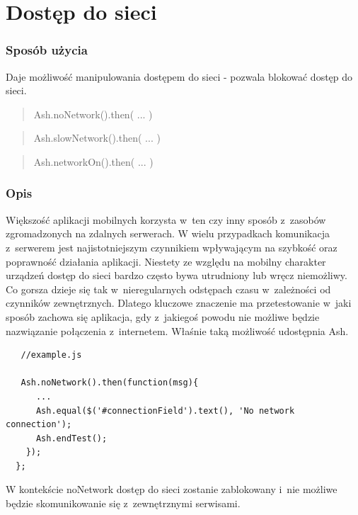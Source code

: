 \documentclass[brudnopis]{xmgr}
\begin{document}
\section{Dostęp do sieci}

\subsubsection{Sposób użycia}

Daje możliwość manipulowania dostępem do sieci - pozwala blokować dostęp do sieci.

\begin{quote}
Ash.noNetwork().then( ... ) 
\end{quote}

\begin{quote}
Ash.slowNetwork().then( ... ) 
\end{quote}

\begin{quote}
Ash.networkOn().then( ... ) 
\end{quote}

\subsubsection{Opis}

Większość aplikacji mobilnych korzysta w~ten czy inny sposób z~zasobów zgromadzonych na zdalnych serwerach. W wielu przypadkach komunikacja z~serwerem jest najistotniejszym czynnikiem wpływającym na szybkość oraz poprawność działania aplikacji. Niestety ze względu na mobilny charakter urządzeń dostęp do sieci bardzo często bywa utrudniony lub wręcz niemożliwy. Co gorsza dzieje się tak w~nieregularnych odstępach czasu w~zależności od czynników zewnętrznych. Dlatego kluczowe znaczenie ma przetestowanie w~jaki sposób zachowa się aplikacja, gdy z~jakiegoś powodu nie możliwe będzie nazwiązanie połączenia z~internetem. Właśnie taką możliwość udostępnia Ash. 

\begin{lstlisting}
   //example.js

   Ash.noNetwork().then(function(msg){
      ...
      Ash.equal($('#connectionField').text(), 'No network connection');
      Ash.endTest();
    });
  };
\end{lstlisting}

W kontekście noNetwork dostęp do sieci zostanie zablokowany i~nie możliwe będzie skomunikowanie się z~zewnętrznymi serwisami.
\end{document}
